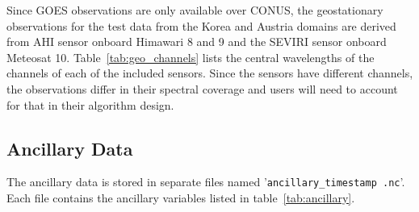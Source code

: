 \documentclass[11pt]{article}
\begin{document}
Since GOES observations are only available over CONUS, the geostationary
observations for the test data from the Korea and Austria domains are derived
from AHI sensor onboard Himawari 8 and 9 and the SEVIRI sensor onboard Meteosat
10. Table~\ref{tab:geo_channels} lists the central wavelengths of the
channels of each of the included sensors. Since the sensors have different
channels, the observations differ in their spectral coverage and users will need
to account for that in their algorithm design.

\subsection{Ancillary Data}

The ancillary data is stored in separate files named
'\texttt{ancillary\_\textlangle timestamp \textrangle.nc}'. Each file contains
the ancillary variables listed in table~\ref{tab:ancillary}.
\end{document}
